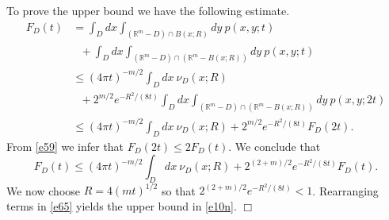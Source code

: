 \documentclass[a4paper,9pt]{amsart}
\begin{document}
To prove the upper bound we have the following estimate.
\begin{align*}
F_D(t)&=\int_Ddx\int_{({\mathbb{R}}^m-D)\cap B(x;R)}dy\ p(x,y;t)\nonumber
\\ &\ \ \  +\int_Ddx\int_{({\mathbb{R}}^m-D)\cap ({\mathbb{R}}^m-B(x;R))}dy\ p(x,y;t)\nonumber \\
&\le (4\pi t)^{-m/2}\int_Ddx\ \nu_D(x;R)\nonumber
\\ &\ \ \ +2^{m/2}e^{-R^2/(8t)}\int_Ddx\int_{({\mathbb{R}}^m-D)\cap ({\mathbb{R}}^m-B(x;R))}dy\
p(x,y;2t)\nonumber \\ & \le (4\pi t)^{-m/2}\int_Ddx\
\nu_D(x;R)+2^{m/2}e^{-R^2/(8t)}F_D(2t).
\end{align*}
From \eqref{e59} we infer that $F_D(2t)\le 2F_D(t)$. We conclude
that
\begin{equation}\label{e65}
F_D(t)\le (4\pi t)^{-m/2}\int_Ddx\
\nu_D(x;R)+2^{(2+m)/2}e^{-R^2/(8t)}F_D(t).
\end{equation}
We now choose $R=4(mt)^{1/2}$ so that
$2^{(2+m)/2}e^{-R^2/(8t)}<1$. Rearranging terms in \eqref{e65}
yields the upper bound in \eqref{e10n}. \hspace{79mm}$\Box$
\end{document}
